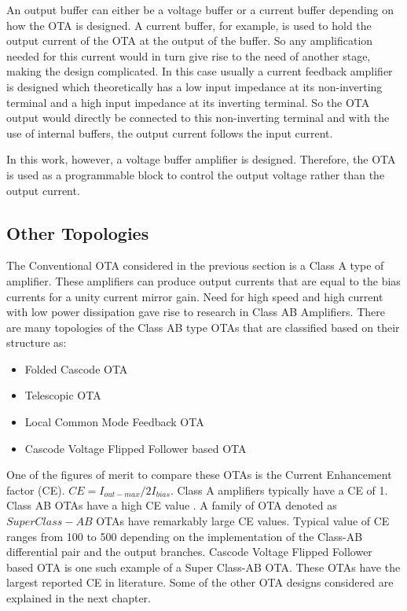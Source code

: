 An output buffer can either be a voltage buffer or a current buffer depending on how the OTA is designed. A current buffer, for example, is used to hold the output current of the OTA at the output of the buffer. So any amplification needed for this current would in turn give rise to the need of another stage, making the design complicated. In this case usually a current feedback amplifier is designed which theoretically has a low input impedance at its non-inverting terminal and a high input impedance at its inverting terminal. So the OTA output would directly be connected to this non-inverting terminal and with the use of internal buffers, the output current follows the input current.

In this work, however, a voltage buffer amplifier is designed. Therefore, the OTA is used as a programmable block to control the output voltage rather than the output current.

\subsection{Other Topologies}
The Conventional OTA considered in the previous section is a Class A type of amplifier. These amplifiers can produce output currents that are equal to the bias currents for a unity current mirror gain. Need for high speed and high current with low power dissipation gave rise to research in Class AB Amplifiers. There are many topologies of the Class AB type OTAs that are classified based on their structure as:
\begin{itemize}
\item Folded Cascode OTA \cite{folded_cascode}
\item Telescopic OTA \cite{telescopic}
\item Local Common Mode Feedback OTA \cite{lcmfb_ota}
\item Cascode Voltage Flipped Follower based OTA \cite{super_class_ab}
\end{itemize}

One of the figures of merit to compare these OTAs is the Current Enhancement factor (CE). $CE = I_{out-max}/2I_{bias}$. Class A amplifiers typically have a CE of 1. Class AB OTAs have a high CE value \cite{pourashraf2017high}. A family of OTA denoted as $Super Class-AB$ OTAs have remarkably large CE values. Typical value of CE ranges from 100 to 500 depending on the implementation of the Class-AB differential pair and the output branches. Cascode Voltage Flipped Follower based OTA is one such example of a Super Class-AB OTA. These OTAs have the largest reported CE in literature. Some of the other OTA designs considered are explained in the next chapter.

